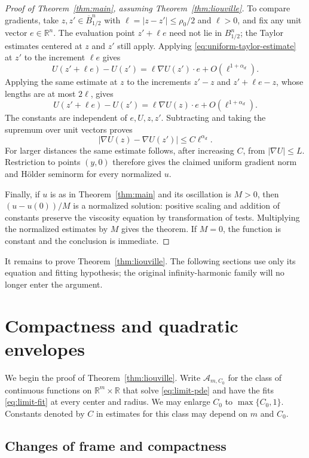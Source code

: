 \documentclass[11pt]{article}
\numberwithin{equation}{section}
\theoremstyle{definition}
\theoremstyle{remark}
\newcommand{\R}{\mathbb{R}}
\newcommand{\Aclass}{\mathcal{A}}
\begin{document}
\begin{proof}[Proof of Theorem~\ref{thm:main}, assuming Theorem~\ref{thm:liouville}]
To compare gradients, take $z,z'\in\overline B_{1/2}^n$ with $\ell=|z-z'|\le\rho_0/2$ and $\ell>0$, and fix any unit vector $e\in\R^n$. The evaluation point $z'+\ell e$ need not lie in $B_{1/2}^n$; the Taylor estimates centered at $z$ and $z'$ still apply. Applying \eqref{eq:uniform-taylor-estimate} at $z'$ to the increment $\ell e$ gives
\[
  U(z'+\ell e)-U(z')
       =\ell\nabla U(z')\cdot e+O(\ell^{1+\alpha_d}).
\]
Applying the same estimate at $z$ to the increments $z'-z$ and $z'+\ell e-z$, whose lengths are at most $2\ell$, gives
\[
  U(z'+\ell e)-U(z')
       =\ell\nabla U(z)\cdot e+O(\ell^{1+\alpha_d}).
\]
The constants are independent of $e,U,z,z'$. Subtracting and taking the supremum over unit vectors proves
\[
  |\nabla U(z)-\nabla U(z')|\le C\ell^{\alpha_d}.
\]
For larger distances the same estimate follows, after increasing $C$, from $|\nabla U|\le L$. Restriction to points $(y,0)$ therefore gives the claimed uniform gradient norm and H\"older seminorm for every normalized $u$.

Finally, if $u$ is as in Theorem~\ref{thm:main} and its oscillation is $M>0$, then $(u-u(0))/M$ is a normalized solution: positive scaling and addition of constants preserve the viscosity equation by transformation of tests. Multiplying the normalized estimates by $M$ gives the theorem. If $M=0$, the function is constant and the conclusion is immediate.
\end{proof}

It remains to prove Theorem~\ref{thm:liouville}. The following sections use only its equation and fitting hypothesis; the original infinity-harmonic family will no longer enter the argument.

\section{Compactness and quadratic envelopes}\label{sec:limiting-tools}

We begin the proof of Theorem~\ref{thm:liouville}. Write
$\Aclass_{m,C_0}$ for the class of continuous functions on
$\R^m\times\R$ that solve \eqref{eq:limit-pde} and have the fits
\eqref{eq:limit-fit} at every center and radius. We may enlarge $C_0$ to
$\max\{C_0,1\}$. Constants denoted by $C$ in estimates for this class
may depend on $m$ and $C_0$.

\subsection{Changes of frame and compactness}
\end{document}
